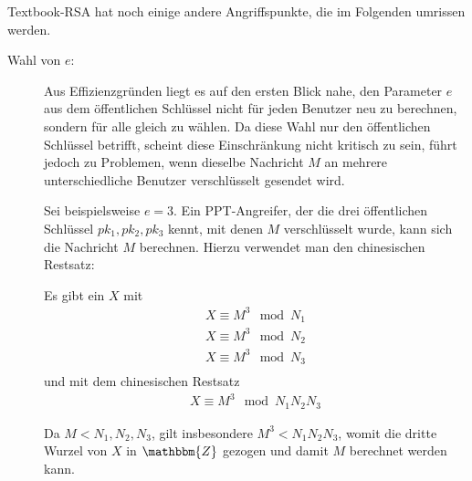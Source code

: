 Textbook-RSA hat noch einige andere Angriffspunkte, die im Folgenden
umrissen werden.

\begin{description}
\item[Wahl von $e$:] Aus Effizienzgründen liegt es auf den ersten Blick
  nahe, den Parameter $e$ aus dem öffentlichen Schlüssel nicht für jeden
  Benutzer neu zu berechnen, sondern für alle gleich zu wählen. Da diese
  Wahl nur den öffentlichen Schlüssel betrifft, scheint diese
  Einschränkung nicht kritisch zu sein, führt jedoch zu Problemen, wenn
  dieselbe Nachricht $M$ an mehrere unterschiedliche Benutzer
  verschlüsselt gesendet wird.
  
  Sei beispielsweise $e=3$. Ein PPT-Angreifer, der die drei öffentlichen
  Schlüssel $pk_1, pk_2, pk_3$ kennt, mit denen $M$ verschlüsselt wurde,
  kann sich die Nachricht $M$ berechnen. Hierzu verwendet man den
  chinesischen Restsatz:

  Es gibt ein $X$ mit
  \begin{align*} X \equiv M^3 \mod N_1\\ X \equiv M^3 \mod N_2\\ X
    \equiv M^3 \mod N_3\\
  \end{align*} und mit dem chinesischen Restsatz
  \begin{align*} X \equiv M^3 \mod N_1N_2N_3
  \end{align*}

  Da $M < N_1, N_2, N_3$, gilt insbesondere $M^3<N_1N_2N_3$, womit die
  dritte Wurzel von $X$ in $\mathbbm{Z}$ gezogen und damit $M$ berechnet
  werden kann.
  

\end{description}
